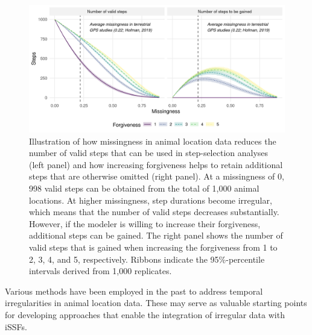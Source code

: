 \documentclass[../FinalThesis.tex]{subfiles}
\begin{document}
\begin{figure}[htpb]
  \begin{center}
  \includegraphics[width = \textwidth]{Figures/NumberOfSteps.png}
  \caption{Illustration of how missingness in animal location data reduces the
  number of valid steps that can be used in step-selection analyses (left panel)
  and how increasing forgiveness helps to retain additional steps that are
  otherwise omitted (right panel). At a missingness of 0, 998 valid steps can be
  obtained from the total of 1,000 animal locations. At higher missingness,
  step durations become irregular, which means that the number of valid steps
  decreases substantially. However, if the modeler is willing to increase their
  forgiveness, additional steps can be gained. The right panel shows the number
  of valid steps that is gained when increasing the forgiveness from 1 to
  2, 3, 4, and 5, respectively. Ribbons indicate the 95\%-percentile intervals
  derived from 1,000 replicates.}
  \label{NumberOfSteps}
  \end{center}
\end{figure}

Various methods have been employed in the past to address temporal
irregularities in animal location data. These may serve as valuable starting
points for developing approaches that enable the integration of irregular data
with iSSFs.
\end{document}
